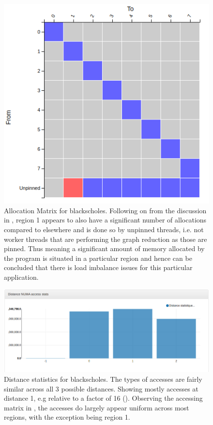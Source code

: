 \documentclass[a4paper,11pt]{article}
\begin{document}
\begin{figure}[!htb]
    \centering
    \includegraphics[width=0.5\linewidth]{TechMemo/results/blackscholes/allocation_matrix.png}
    \caption{Allocation Matrix for blackscholes. Following on from the discussion in , region 1 appears to also have a significant number of allocations compared to elsewhere and is done so by unpinned threads, i.e. not worker threads that are performing the graph reduction as those are pinned. Thus meaning a significant amount of memory allocated by the program is situated in a particular region and hence can be concluded that there is load imbalance issues for this particular application.
    }
    \label{fig:bscholes_alloc_matrix}
\end{figure}

\begin{figure}[!htb]
    \centering
    \includegraphics[width=\linewidth]{TechMemo/results/blackscholes/blackscholes_distance.png}
    \caption{Distance statistics for blackscholes. The types of accesses are fairly similar across all 3 possible distances. Showing mostly accesses at distance 1, e.g relative to a factor of 16 (). Observing the accessing matrix in , the accesses do largely appear uniform across most regions, with the exception being region 1.}
    \label{fig:blackscholes_distance}
\end{figure}
\end{document}

